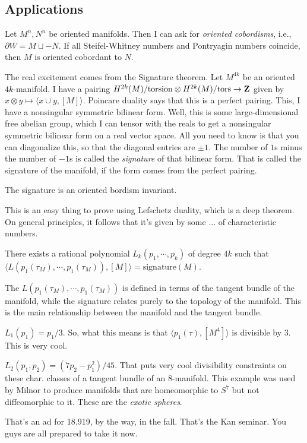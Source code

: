 \subsection{Applications}
\begin{theorem}[Wall]
    Let $M^n,N^n$ be oriented manifolds.
    Then I can ask for \emph{oriented cobordisms}, i.e., $\partial W = M\sqcup -N$.
    If all Steifel-Whitney numbers and Pontryagin numbers coincide, then $M$ is oriented cobordant to $N$.
\end{theorem}
The real excitement comes from the Signature theorem.
Let $M^{4k}$ be an oriented $4k$-manifold.
I have a pairing $H^{2k}(M)/\mathrm{torsion}\otimes H^{2k}(M)/\mathrm{tors}\to \mathbf Z$ given by $x\otimes y\mapsto\langle x\cup y,[M]\rangle$.
Poincare duality says that this is a perfect pairing.
This, I have a nonsingular symmetric bilinear form.
Well, this is some large-dimensional free abelian group, which I can tensor with the reals to get a nonsingular symmetric bilinear form on a real vector space.
All you need to know is that you can diagonalize this, so that the diagonal entries are $\pm 1$.
The number of $1$s minus the number of $-1$s is called the \emph{signature} of that bilinear form.
That is called the signature of the manifold, if the form comes from the perfect pairing.
\begin{lemma}[Thom]
    The signature is an oriented bordism invariant.
\end{lemma}
This is an easy thing to prove using Lefschetz duality, which is a deep theorem.
On general principles, it follows that it's given by some ... of characteristic numbers.
\begin{theorem}
    There exists a rational polynomial $L_k(p_1,\cdots,p_k)$ of degree $4k$ such that $\langle L(p_1(\tau_M),\cdots,p_1(\tau_M)),[M]\rangle = \mathrm{signature}(M)$.
\end{theorem}
The $L(p_1(\tau_M),\cdots,p_1(\tau_M))$ is defined in terms of the tangent bundle of the manifold, while the signature relates purely to the topology of the manifold.
This is the main relationship between the manifold and the tangent bundle.
\begin{example}
    $L_1(p_1) = p_1/3$.
    So, what this means is that $\langle p_1(\tau),[M^4]\rangle$ is divisible by $3$.
    This is very cool.
\end{example}
\begin{example}
    $L_2(p_1,p_2) = (7p_2 - p_1^2)/45$.
    That puts very cool divisibility constraints on these char. classes of a tangent bundle of an $8$-manifold.
    This example was used by Milnor to produce manifolds that are homeomorphic to $S^7$ but not diffeomorphic to it.
    These are the \emph{exotic spheres}.
\end{example}
That's an ad for 18.919, by the way, in the fall.
That's the Kan seminar.
You guys are all prepared to take it now.
